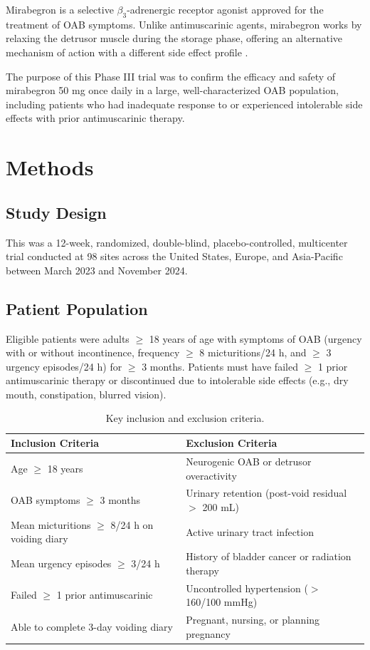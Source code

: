 \documentclass[
    language=english,
    doctype=clinical-report,
    institution=none,
]{../../omnilatex}
\begin{document}
Mirabegron is a selective $\beta_3$-adrenergic receptor agonist approved
for the treatment of OAB symptoms. Unlike antimuscarinic agents, mirabegron
works by relaxing the detrusor muscle during the storage phase, offering an
alternative mechanism of action with a different side effect profile
\cite{chapple2014randomised}.

The purpose of this Phase III trial was to confirm the efficacy and safety
of mirabegron 50 mg once daily in a large, well-characterized OAB population,
including patients who had inadequate response to or experienced intolerable
side effects with prior antimuscarinic therapy.

\section{Methods}
\label{sec:methods}

\subsection{Study Design}

This was a 12-week, randomized, double-blind, placebo-controlled, multicenter
trial conducted at 98 sites across the United States, Europe, and Asia-Pacific
between March 2023 and November 2024.

\subsection{Patient Population}

Eligible patients were adults $\geq$ 18 years of age with symptoms of OAB
(urgency with or without incontinence, frequency $\geq$ 8 micturitions/24 h,
and $\geq$ 3 urgency episodes/24 h) for $\geq$ 3 months. Patients must have
failed $\geq$ 1 prior antimuscarinic therapy or discontinued due to
intolerable side effects (e.g., dry mouth, constipation, blurred vision).

\begin{table}[htbp]
    \centering
    \caption{Key inclusion and exclusion criteria.}
    \label{tab:criteria}
    \begin{tabular}{@{}p{7cm}p{7cm}@{}}
        \toprule
        \textbf{Inclusion Criteria} & \textbf{Exclusion Criteria} \\
        \midrule
        Age $\geq$ 18 years & Neurogenic OAB or detrusor overactivity \\
        OAB symptoms $\geq$ 3 months & Urinary retention (post-void residual $>$ 200 mL) \\
        Mean micturitions $\geq$ 8/24 h on voiding diary & Active urinary tract infection \\
        Mean urgency episodes $\geq$ 3/24 h & History of bladder cancer or radiation therapy \\
        Failed $\geq$ 1 prior antimuscarinic & Uncontrolled hypertension ($>$ 160/100 mmHg) \\
        Able to complete 3-day voiding diary & Pregnant, nursing, or planning pregnancy \\
        \bottomrule
    \end{tabular}
\end{table}
\end{document}
